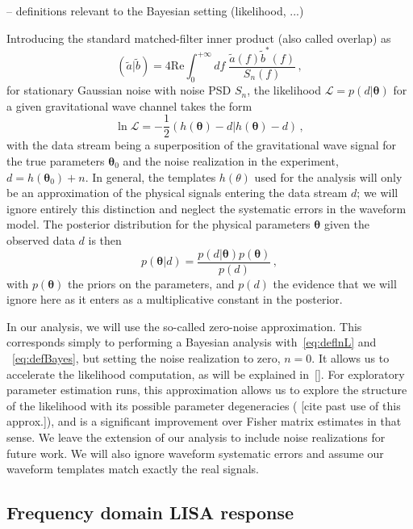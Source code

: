 \documentclass[aps,showpacs,twocolumn,prd,superscriptaddress,nofootinbib]{revtex4-1}
\newcommand{\be}{\begin{equation}}
\newcommand{\ee}{\end{equation}}
\newcommand\calL{{\mathcal{L}}}
\newcommand{\SM}[1]{{\color{Blue} #1}}
\begin{document}
-- definitions relevant to the Bayesian setting (likelihood, ...)

Introducing the standard matched-filter inner product (also called overlap) as
\be\label{eq:definnerproduct}
	( \tilde{a} | \tilde{b} ) = 4 \mathrm{Re} \int_{0}^{+\infty} df \; \frac{\tilde{a}(f) \tilde{b}^{*}(f)}{S_{n}(f)} \,,
\ee
for stationary Gaussian noise with noise PSD $S_{n}$, the likelihood $\calL = p(d | \bm{\theta})$ for a given gravitational wave channel takes the form
\be\label{eq:deflnL}
	\ln \calL = -\frac{1}{2} \left( h(\bm{\theta}) - d | h(\bm{\theta}) - d \right) \,,
\ee
with the data stream being a superposition of the gravitational wave signal for the true parameters $\bm{\theta}_{0}$ and the noise realization in the experiment, $d = h(\bm{\theta}_{0}) + n$. In general, the templates $h(\theta)$ used for the analysis will only be an approximation of the physical signals entering the data stream $d$; we will ignore entirely this distinction and neglect the systematic errors in the waveform model. The posterior distribution for the physical parameters $\bm{\theta}$ given the observed data $d$ is then
\be\label{eq:defBayes}
	p\left( \bm{\theta} | d \right) = \frac{p(d | \bm{\theta})p(\bm{\theta})}{p(d)}\,,
\ee
with $p(\bm{\theta})$ the priors on the parameters, and $p(d)$ the evidence that we will ignore here as it enters as a multiplicative constant in the posterior.

In our analysis, we will use the so-called zero-noise approximation. This corresponds simply to performing a Bayesian analysis with~\eqref{eq:deflnL} and ~\eqref{eq:defBayes}, but setting the noise realization to zero, $n=0$. It allows us to accelerate the likelihood computation, as will be explained in~\ref{}. For exploratory parameter estimation runs, this approximation allows us to explore the structure of the likelihood with its possible parameter degeneracies (\SM{[cite past use of this approx.]}), and is a significant improvement over Fisher matrix estimates in that sense. We leave the extension of our analysis to include noise realizations for future work. We will also ignore waveform systematic errors and assume our waveform templates match exactly the real signals.


\subsection{Frequency domain LISA response}
\label{subsec:response}
\end{document}
